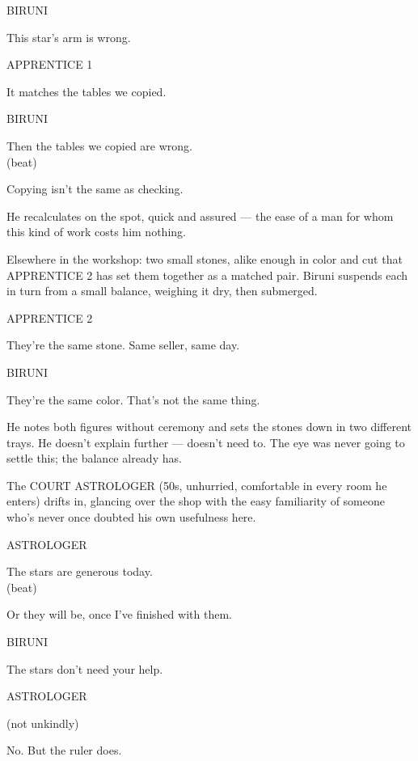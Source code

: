 \documentclass[12pt]{article}
\newcommand{\action}[1]{%
  \par\noindent #1\par\vspace{0.6\baselineskip}%
}
\newcommand{\charcue}[1]{%
  \needspace{3\baselineskip}%
  \par\vspace{0.3\baselineskip}\noindent\hspace*{2.2in}#1\par%
}
\newenvironment{dialogue}{%
  \begin{list}{}{%
    \setlength{\leftmargin}{1.1in}%
    \setlength{\rightmargin}{1.6in}%
    \setlength{\listparindent}{0pt}%
    \setlength{\itemindent}{0pt}%
    \setlength{\parsep}{0pt}%
    \setlength{\itemsep}{0pt}%
    \setlength{\topsep}{0pt}%
  }\item[]%
}{%
  \end{list}\vspace{0.4\baselineskip}%
}
\newcommand{\parenthetical}[1]{%
  \hspace*{-0.4in}\hspace*{1.1in}(#1)\par%
}
\begin{document}
\charcue{BIRUNI}
\begin{dialogue}
This star's arm is wrong.\\
\end{dialogue}
\charcue{APPRENTICE 1}
\begin{dialogue}
It matches the tables we copied.\\
\end{dialogue}
\charcue{BIRUNI}
\begin{dialogue}
Then the tables we copied are wrong.\\
\parenthetical{beat}
Copying isn't the same as checking.\\
\end{dialogue}
\action{He recalculates on the spot, quick and assured --- the ease of a man for whom this kind of work costs him nothing.}
\action{Elsewhere in the workshop: two small stones, alike enough in color and cut that APPRENTICE 2 has set them together as a matched pair. Biruni suspends each in turn from a small balance, weighing it dry, then submerged.}
\charcue{APPRENTICE 2}
\begin{dialogue}
They're the same stone. Same seller, same day.\\
\end{dialogue}
\charcue{BIRUNI}
\begin{dialogue}
They're the same color. That's not the same thing.\\
\end{dialogue}
\action{He notes both figures without ceremony and sets the stones down in two different trays. He doesn't explain further --- doesn't need to. The eye was never going to settle this; the balance already has.}
\action{The COURT ASTROLOGER (50s, unhurried, comfortable in every room he enters) drifts in, glancing over the shop with the easy familiarity of someone who's never once doubted his own usefulness here.}
\charcue{ASTROLOGER}
\begin{dialogue}
The stars are generous today.\\
\parenthetical{beat}
Or they will be, once I've finished with them.\\
\end{dialogue}
\charcue{BIRUNI}
\begin{dialogue}
The stars don't need your help.\\
\end{dialogue}
\charcue{ASTROLOGER}
\begin{dialogue}
\parenthetical{not unkindly}
No. But the ruler does.\\
\end{dialogue}
\end{document}
